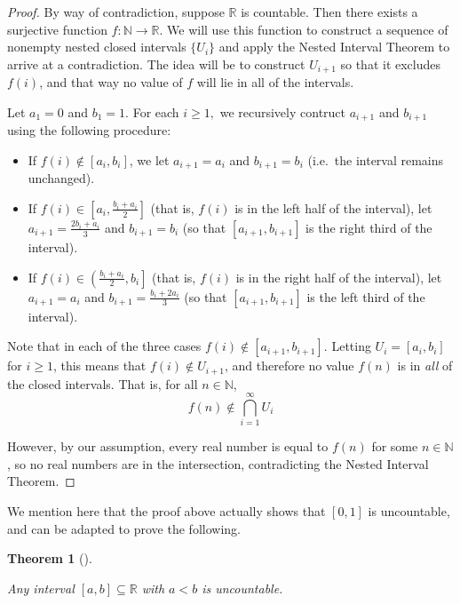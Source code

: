 \documentclass[
  letterpaper,
  DIV=11,
  numbers=noendperiod]{scrreprt}
\providecommand{\tightlist}{%
  \setlength{\itemsep}{0pt}\setlength{\parskip}{0pt}}
\def\R{\mathbb R}
\def\N{\mathbb N}
\theoremstyle{plain}
\newtheorem{theorem}{Theorem}[chapter]
\theoremstyle{definition}
\theoremstyle{plain}
\theoremstyle{plain}
\theoremstyle{definition}
\theoremstyle{definition}
\theoremstyle{remark}
\begin{document}
\begin{proof}
By way of contradiction, suppose \(\R\) is countable. Then there exists
a surjective function \(f:\N\rightarrow\R\). We will use this function
to construct a sequence of nonempty nested closed intervals \(\{U_i\}\)
and apply the Nested Interval Theorem to arrive at a contradiction. The
idea will be to construct \(U_{i+1}\) so that it excludes \(f(i)\), and
that way no value of \(f\) will lie in all of the intervals.

Let \(a_1=0\) and \(b_1=1.\) For each \(i\geq 1,\) we recursively
contruct \(a_{i+1}\) and \(b_{i+1}\) using the following procedure:

\begin{itemize}
\tightlist
\item
  If \(f(i)\notin [a_i,b_i]\), we let \(a_{i+1}=a_i\) and
  \(b_{i+1}=b_i\) (i.e.~the interval remains unchanged).
\item
  If \(f(i)\in\left[a_i,\frac{b_i+a_i}{2}\right]\) (that is, \(f(i)\) is
  in the left half of the interval), let \(a_{i+1}=\frac{2b_i+a_i}{3}\)
  and \(b_{i+1}=b_i\) (so that \([a_{i+1},b_{i+1}]\) is the right third
  of the interval).
\item
  If \(f(i)\in\left(\frac{b_i+a_i}{2}, b_i\right]\) (that is, \(f(i)\)
  is in the right half of the interval), let \(a_{i+1}=a_i\) and
  \(b_{i+1}=\frac{b_i+2a_i}{3}\) (so that \([a_{i+1},b_{i+1}]\) is the
  left third of the interval).
\end{itemize}

Note that in each of the three cases \(f(i)\notin [a_{i+1},b_{i+1}]\).
Letting \(U_i=[a_i,b_i]\) for \(i\geq1\), this means that
\(f(i)\notin U_{i+1}\), and therefore no value \(f(n)\) is in \emph{all}
of the closed intervals. That is, for all \(n\in\N\),
\[f(n)\notin\bigcap_{i=1}^\infty U_i\]

However, by our assumption, every real number is equal to \(f(n)\) for
some \(n\in\N\), so no real numbers are in the intersection,
contradicting the Nested Interval Theorem.
\end{proof}

We mention here that the proof above actually shows that \([0,1]\) is
uncountable, and can be adapted to prove the following.

\begin{theorem}[]\protect\hypertarget{thm-intervals-uncountable}{}\label{thm-intervals-uncountable}

Any interval \([a,b]\subseteq\R\) with \(a<b\) is uncountable.

\end{theorem}
\end{document}
